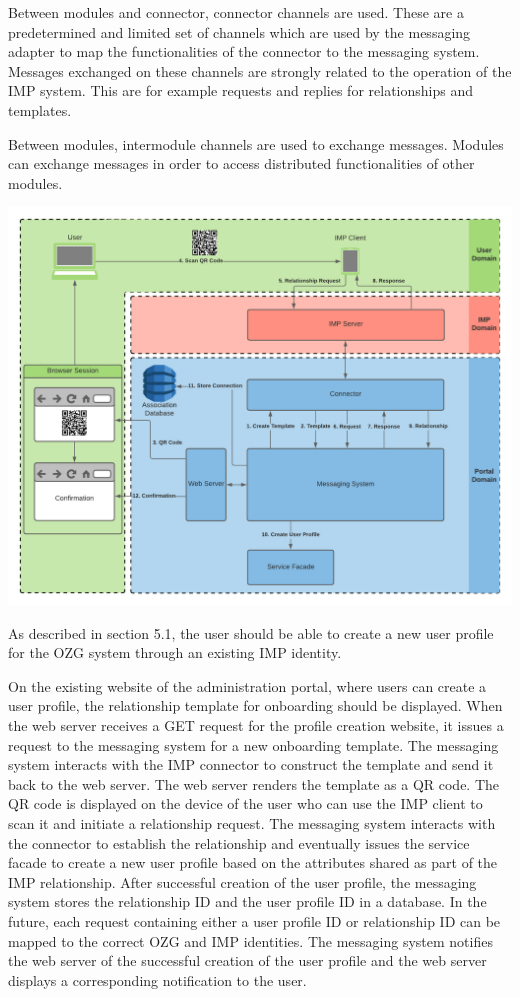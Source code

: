 Between modules and connector, connector channels are used. These are a predetermined and limited set of channels which are used by the messaging adapter to map the functionalities of the connector to the messaging system. Messages exchanged on these channels are strongly related to the operation of the IMP system. This are for example requests and replies for relationships and templates.

Between modules, intermodule channels are used to exchange messages. Modules can exchange messages in order to access distributed functionalities of other modules.

\begin{center}
    \includegraphics[scale=0.6]{Diagrams/Integration Architecture 1/Technological Integration/5. Onboarding Overview.pdf}
\end{center}


As described in section 5.1, the user should be able to create a new user profile for the OZG system through an existing IMP identity.

On the existing website of the administration portal, where users can create a user profile, the relationship template for onboarding should be displayed. When the web server receives a GET request for the profile creation website, it issues a request to the messaging system for a new onboarding template. The messaging system interacts with the IMP connector to construct the template and send it back to the web server. The web server renders the template as a QR code. The QR code is displayed on the device of the user who can use the IMP client to scan it and initiate a relationship request. The messaging system interacts with the connector to establish the relationship and eventually issues the service facade to create a new user profile based on the attributes shared as part of the IMP relationship. After successful creation of the user profile, the messaging system stores the relationship ID and the user profile ID in a database. In the future, each request containing either a user profile ID or relationship ID can be mapped to the correct OZG and IMP identities. The messaging system notifies the web server of the successful creation of the user profile and the web server displays a corresponding notification to the user.

